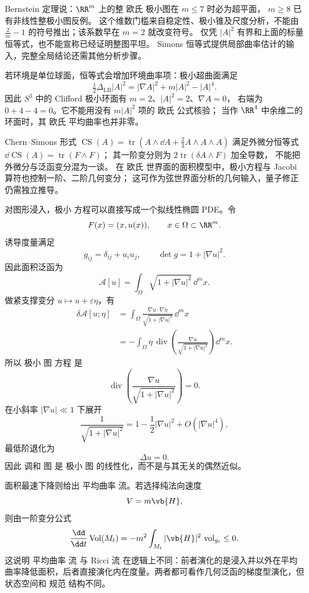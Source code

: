 \begin{note}
Bernstein 定理说：$\RR^m$ 上的整 欧氏 极小图在 $m\le7$ 时必为超平面，
$m\ge8$ 已有非线性整极小图反例。
这个维数门槛来自稳定性、极小锥及尺度分析，不能由
$\tfrac2m-1$ 的符号推出；该系数早在 $m=2$ 就改变符号。
仅凭 $|A|^2$ 有界和上面的标量恒等式，也不能宣称已经证明整图平坦。
Simons 恒等式提供局部曲率估计的输入，完整全局结论还需其他分析步骤。

若环境是单位球面，恒等式会增加环境曲率项：极小超曲面满足
\[
\tfrac12\Delta_{\mathrm{LB}}|A|^2
=|\nabla A|^2+m|A|^2-|A|^4.
\]
因此 $S^3$ 中的 Clifford 极小环面有 $m=2$、$|A|^2=2$、$\nabla A=0$，
右端为 $0+4-4=0$。它不能用没有 $m|A|^2$ 项的 欧氏 公式核验；
当作 $\RR^4$ 中余维二的环面时，其 欧氏 平均曲率也并非零。

Chern--Simons 形式
$\operatorname{CS}(A)=\operatorname{tr}(A\wedge\dd A+\tfrac23A\wedge A\wedge A)$
满足外微分恒等式 $\dd\operatorname{CS}(A)=\operatorname{tr}(F\wedge F)$；
其一阶变分则为 $2\operatorname{tr}(\delta A\wedge F)$ 加全导数，
不能把外微分与泛函变分混为一谈。
在 欧氏 世界面的面积模型中，极小方程与 Jacobi 算符也控制一阶、二阶几何变分；
这可作为弦世界面分析的几何输入，量子修正仍需独立推导。
\end{note}

对图形浸入，极小 方程可以直接写成一个拟线性椭圆 PDE。令
\[
F(x)=(x,u(x)),
\qquad x\in\Omega\subset\RR^m.
\]
诱导度量满足
\[
g_{ij}=\delta_{ij}+u_i u_j,
\qquad
\det g=1+|\nabla u|^2.
\]
因此面积泛函为
\begin{equation*}\mathcal A[u]
=\int_\Omega\sqrt{1+|\nabla u|^2}\,\dd^m x.\end{equation*}
做紧支撑变分 $u\mapsto u+\varepsilon\eta$，有
\[
\begin{aligned}
\delta\mathcal A[u;\eta]
&=\int_\Omega
\frac{\nabla u\cdot\nabla\eta}
{\sqrt{1+|\nabla u|^2}}\,\dd^mx\\
&=-\int_\Omega
\eta\,
\operatorname{div}\left(
\frac{\nabla u}{\sqrt{1+|\nabla u|^2}}
\right)\dd^mx.
\end{aligned}
\]
所以 极小 图 方程 是
\begin{equation*}{
\operatorname{div}\left(
\frac{\nabla u}{\sqrt{1+|\nabla u|^2}}
\right)=0
}.\end{equation*}
在小斜率 $|\nabla u|\ll1$ 下展开
\[
\frac{1}{\sqrt{1+|\nabla u|^2}}
=1-\frac12|\nabla u|^2+O(|\nabla u|^4),
\]
最低阶退化为
\[
\Delta u=0.
\]
因此 调和 图 是 极小 图 的线性化，而不是与其无关的偶然近似。

面积最速下降则给出 平均曲率 流。若选择纯法向速度
\[
V=m\vb{H},
\]
则由一阶变分公式
\[
\frac{\dd}{\dd t}\operatorname{Vol}(M_t)
=-m^2\int_{M_t}|\vb{H}|^2\,\operatorname{vol}_{g_t}\le0.
\]
这说明 平均曲率 流 与 Ricci 流 在逻辑上不同：前者演化的是浸入并以外在平均曲率降低面积，后者直接演化内在度量。两者都可看作几何泛函的梯度型演化，但状态空间和 规范 结构不同。

